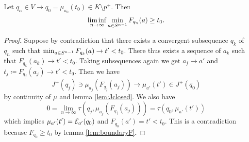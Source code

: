 \begin{lemma}
    Let $q_n\in V\to q_0=\mu_{a_0}(t_0)\in K\setminus p^+$. Then 
    \[
        \liminf_{n\to \infty} \min_{a \in {S^{n-1}}} F_{q_n}(a) \ge t_0.
    \]
\end{lemma}
\begin{proof}
    Suppose by contradiction that there exists a convergent subsequence $q_k$ of $q_n$ such that $\min_{a \in {S^{n-1}}} F_{q_k}(a)\to t'<t_0$. There thus exists a sequence of $a_k$ such that $F_{q_k}(a_k)\to t'<t_0$. Taking subsequences again we get $a_j\to a'$ and $t_j\coloneqq F_{q_j}(a_j)\to t'<t_0$. Then we have 
    \[
        J^+(q_j)\ni \mu_{a_j}(F_{q_j}(a_j)) \to \mu_{a'}(t') \in J^+(q_0)
    \] by continuity of $\mu$ and lemma \ref{lem:Jclosed}. We also have 
    \[
        0 = \lim_{n\to \infty}\tau(q_j,\mu_{a_j}(F_{q_j}(a_j))) = \tau(q_0,\mu_{a'}(t'))
    \] which implies $\mu_{a'}(t')={\mathcal{E}}_{a'}(q_0)$ and $F_{q_0}(a')=t'<t_0$. This is a contradiction because $F_{q_0}\ge t_0$ by lemma \ref{lem:boundaryF}.
\end{proof}

